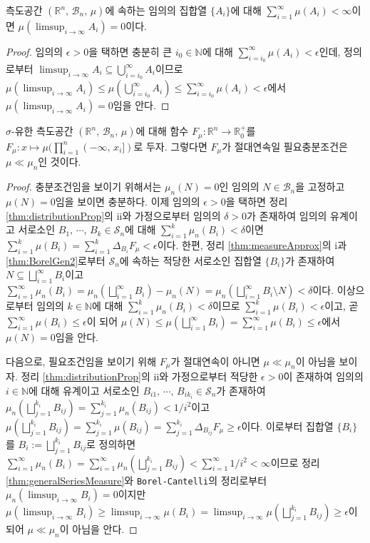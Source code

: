 \begin{theorem}
    측도공간 $(\mathbb{R}^n,\,\mathcal{B}_n,\,\mu)$에 속하는 임의의 집합열 $\{A_i\}$에 대해 $\sum_{i=1}^\infty\mu(A_i)<\infty$이면 $\mu(\limsup_{i\to\infty}A_i)=0$이다.
\end{theorem}

\begin{proof}
    임의의 $\epsilon>0$을 택하면 충분히 큰 $i_0\in\mathbb{N}$에 대해 $\sum_{i=i_0}^\infty\mu(A_i)<\epsilon$인데, 정의로부터 $\limsup_{i\to\infty}A_i\subseteq\bigcup_{i=i_0}^\infty A_i$이므로 $\mu(\limsup_{i\to\infty}A_i)\leq\mu(\bigcup_{i=i_0}^\infty A_i)\leq\sum_{i=i_0}^\infty\mu(A_i)<\epsilon$에서 $\mu(\limsup_{i\to\infty}A_i)=0$임을 안다.
\end{proof}

\begin{theorem}\label{thm:AbsContiRel}
    $\sigma$-유한 측도공간 $(\mathbb{R}^n,\,\mathcal{B}_n,\,\mu)$에 대해 함수 $F_\mu:\mathbb{R}^n\to\mathbb{R}^+_0$를 $F_\mu:x\mapsto\mu(\prod_{i=1}^n(-\infty,\,x_i])$로 두자. 그렇다면 $F_\mu$가 절대연속일 필요충분조건은 $\mu\ll\mu_n$인 것이다.
\end{theorem}

\begin{proof}
    충분조건임을 보이기 위해서는 $\mu_n(N)=0$인 임의의 $N\in\mathcal{B}_n$을 고정하고 $\mu(N)=0$임을 보이면 충분하다. 이제 임의의 $\epsilon>0$을 택하면 정리 \ref{thm:distributionProp}의 ii와 가정으로부터 임의의 $\delta>0$가 존재하여 임의의 유계이고 서로소인 $B_1,\,\cdots,\,B_k\in\mathcal{S}_n$에 대해 $\sum_{i=1}^k\mu_n(B_i)<\delta$이면 $\sum_{i=1}^k\mu(B_i)=\sum_{i=1}^k\Delta_{B_i}F_\mu<\epsilon$이다. 한편, 정리 \ref{thm:measureApprox}의 i과 \ref{thm:BorelGen2}로부터 $\mathcal{S}_n$에 속하는 적당한 서로소인 집합열 $\{B_i\}$가 존재하여 $N\subseteq\bigsqcup_{i=1}^\infty B_i$이고 $\sum_{i=1}^\infty\mu_n(B_i)=\mu_n(\bigsqcup_{i=1}^\infty B_i)-\mu_n(N)=\mu_n(\bigsqcup_{i=1}^\infty B_i\setminus N)<\delta$이다. 이상으로부터 임의의 $k\in\mathbb{N}$에 대해 $\sum_{i=1}^k\mu_n(B_i)<\delta$이므로 $\sum_{i=1}^k\mu(B_i)<\epsilon$이고, 곧 $\sum_{i=1}^\infty\mu(B_i)\leq\epsilon$이 되어 $\mu(N)\leq\mu(\bigsqcup_{i=1}^\infty B_i)=\sum_{i=1}^\infty\mu(B_i)\leq\epsilon$에서 $\mu(N)=0$임을 안다.

    다음으로, 필요조건임을 보이기 위해 $F_\mu$가 절대연속이 아니면 $\mu\ll\mu_n$이 아님을 보이자. 정리 \ref{thm:distributionProp}의 ii와 가정으로부터 적당한 $\epsilon>0$이 존재하여 임의의 $i\in\mathbb{N}$에 대해 유계이고 서로소인 $B_{i1},\,\cdots,\,B_{ik_i}\in\mathcal{S}_n$가 존재하여 $\mu_n(\bigsqcup_{j=1}^{k_i}B_{ij})=\sum_{j=1}^{k_i}\mu_n(B_{ij})<1/i^2$이고 $\mu(\bigsqcup_{j=1}^{k_i}B_{ij})=\sum_{j=1}^{k_i}\mu(B_{ij})=\sum_{j=1}^{k_i}\Delta_{B_{ij}}F_\mu\geq\epsilon$이다. 이로부터 집합열 $\{B_i\}$를 $B_i:=\bigsqcup_{j=1}^{k_i}B_{ij}$로 정의하면 $\sum_{i=1}^\infty\mu_n(B_i)=\sum_{i=1}^\infty\mu_n(\bigsqcup_{j=1}^{k_i}B_{ij})<\sum_{i=1}^\infty1/i^2<\infty$이므로 정리 \ref{thm:generalSeriesMeasure}와 \texttt{Borel-Cantelli}의 정리로부터 $\mu_n(\limsup_{i\to\infty}B_i)=0$이지만 $\mu(\limsup_{i\to\infty}B_i)\geq\limsup_{i\to\infty}\mu(B_i)=\limsup_{i\to\infty}\mu(\bigsqcup_{j=1}^{k_i}B_{ij})\geq\epsilon$이 되어 $\mu\ll\mu_n$이 아님을 안다.
\end{proof}

